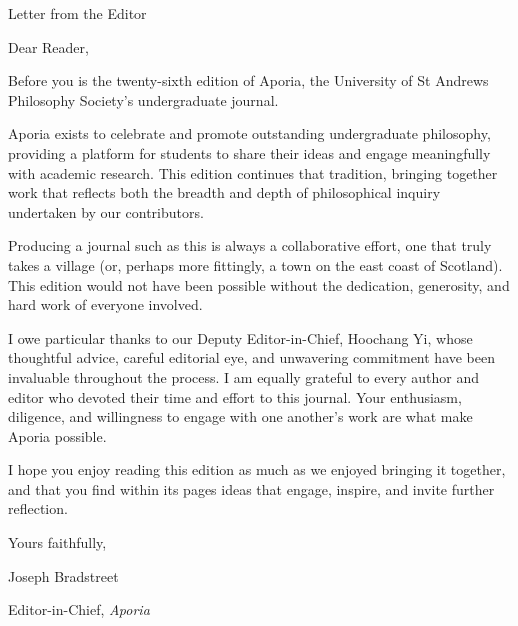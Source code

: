 \vspace*{\credgap}
{\noindent\LARGE\sc Letter from the Editor}
\vspace{\credgap}

\vspace{\ackgap}\noindent
Dear Reader,

\vspace{\credgap}\noindent
Before you is the twenty-sixth edition of Aporia, the University of St Andrews Philosophy Society's undergraduate journal.

Aporia exists to celebrate and promote outstanding undergraduate philosophy, providing a platform for students to share their ideas and engage meaningfully with academic research. This edition continues that tradition, bringing together work that reflects both the breadth and depth of philosophical inquiry undertaken by our contributors.

Producing a journal such as this is always a collaborative effort, one that truly takes a village (or, perhaps more fittingly, a town on the east coast of Scotland). This edition would not have been possible without the dedication, generosity, and hard work of everyone involved.

I owe particular thanks to our Deputy Editor-in-Chief, Hoochang Yi, whose thoughtful advice, careful editorial eye, and unwavering commitment have been invaluable throughout the process. I am equally grateful to every author and editor who devoted their time and effort to this journal. Your enthusiasm, diligence, and willingness to engage with one another's work are what make Aporia possible.

I hope you enjoy reading this edition as much as we enjoyed bringing it together, and that you find within its pages ideas that engage, inspire, and invite further reflection. 

\vspace{\credgap}\noindent
Yours faithfully,

\vspace{\ackgap}\noindent
Joseph Bradstreet 

\noindent
Editor-in-Chief, \emph{Aporia}
